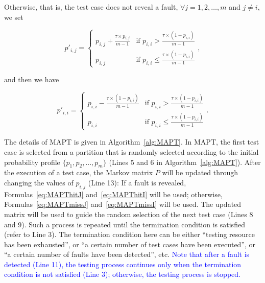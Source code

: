 \documentclass[10pt,journal,compsoc]{IEEEtran}
\begin{document}
Otherwise, that is, the test case does not reveal a fault, $\forall j = 1, 2, \ldots, m$ and $j \neq i$, we set

\begin{equation}
\label{eq:MAPTmissJ}
p'_{i,j} =
\begin{cases}
p_{i,j} + \displaystyle\frac{\tau \times p_{i,j}}{m-1} & \text{if } p_{i,i} > \displaystyle\frac{\tau \times (1-p_{i,i})}{m-1} \\
p_{i,j} & \text{if } p_{i,i} \leq \displaystyle\frac{\tau \times (1-p_{i,i})}{m-1}
\end{cases},
\end{equation}

and then we have

\begin{equation}
\label{eq:MAPTmissI}
p'_{i,i} =
\begin{cases}
p_{i,i} - \displaystyle\frac{\tau \times (1-p_{i,i})}{m-1} & \text{if } p_{i,i} > \displaystyle\frac{\tau \times (1-p_{i,i})}{m-1} \\
p_{i,i} & \text{if } p_{i,i} \leq \displaystyle\frac{\tau \times (1-p_{i,i})}{m-1}
\end{cases}.
\end{equation}

The details of MAPT is given in Algorithm~\ref{alg:MAPT}. In MAPT, the first test case is selected from a partition that is randomly selected according to the initial probability profile $\{p_1, p_2, \ldots, p_m\}$ (Lines 5 and 6 in Algorithm~\ref{alg:MAPT}). After the execution of a test case, the Markov matrix $P$ will be updated through changing the values of $p_{i,j}$ (Line 13): If a fault is revealed, Formulas~\ref{eq:MAPThitJ} and~\ref{eq:MAPThitI} will be used; otherwise, Formulas~\ref{eq:MAPTmissJ} and~\ref{eq:MAPTmissI} will be used. The updated matrix will be used to guide the random selection of the next test case (Lines 8 and 9). Such a process is repeated until the termination condition is satisfied (refer to Line 3). The termination condition here can be either ``testing resource has been exhausted'', or ``a certain number of test cases have been executed'', or ``a certain number of faults have been detected'', etc. \textcolor{blue}{
Note that after a fault is detected (Line 11), the testing process continues only when the termination condition is not satisfied (Line 3); otherwise, the testing process is stopped.}
\end{document}
